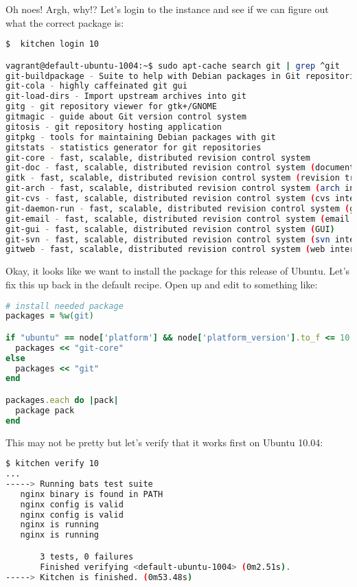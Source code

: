 Oh noes! Argh, why!? Let's login to the instance and see if we can figure out what the correct package is:

\begin{lstlisting}[language=Bash,label=lst:testing-test-kitchen29]
$  kitchen login 10

vagrant@default-ubuntu-1004:~$ sudo apt-cache search git | grep ^git
git-buildpackage - Suite to help with Debian packages in Git repositories
git-cola - highly caffeinated git gui
git-load-dirs - Import upstream archives into git
gitg - git repository viewer for gtk+/GNOME
gitmagic - guide about Git version control system
gitosis - git repository hosting application
gitpkg - tools for maintaining Debian packages with git
gitstats - statistics generator for git repositories
git-core - fast, scalable, distributed revision control system
git-doc - fast, scalable, distributed revision control system (documentation)
gitk - fast, scalable, distributed revision control system (revision tree visualizer)
git-arch - fast, scalable, distributed revision control system (arch interoperability)
git-cvs - fast, scalable, distributed revision control system (cvs interoperability)
git-daemon-run - fast, scalable, distributed revision control system (git-daemon service)
git-email - fast, scalable, distributed revision control system (email add-on)
git-gui - fast, scalable, distributed revision control system (GUI)
git-svn - fast, scalable, distributed revision control system (svn interoperability)
gitweb - fast, scalable, distributed revision control system (web interface)
\end{lstlisting}

Okay, it looks like we want to install the  package for this release of Ubuntu. Let's fix this up back in the default recipe. Open up  and edit to something like:

\begin{lstlisting}[language=Ruby,label=lst:testing-test-kitchen30]
# install needed package
packages = %w(git)

if "ubuntu" == node['platform'] && node['platform_version'].to_f <= 10.04
  packages << "git-core"
else
  packages << "git"
end

packages.each do |pack|
  package pack
end
\end{lstlisting}

This may not be pretty but let's verify that it works first on Ubuntu 10.04:

\begin{lstlisting}[language=Bash,label=lst:testing-test-kitchen31]
$ kitchen verify 10
...
-----> Running bats test suite
   nginx binary is found in PATH
   nginx config is valid                                                    2/3
   nginx config is valid
   nginx is running                                                         3/3
   nginx is running

       3 tests, 0 failures
       Finished verifying <default-ubuntu-1004> (0m2.51s).
-----> Kitchen is finished. (0m53.48s)
\end{lstlisting}

